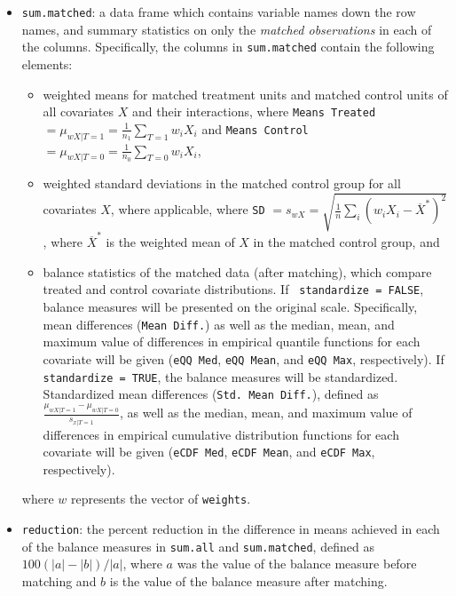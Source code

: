 \begin{itemize}
\item \texttt{sum.matched}: a data frame which contains variable names
  down the row names, and summary statistics on only the \emph{matched
    observations} in each of the columns.  Specifically, the columns
  in \texttt{sum.matched} contain the following elements:
  \begin{itemize}
  \item weighted means for matched treatment units and matched control units of all covariates
    $X$ and their interactions, where \texttt{Means Treated}$=
    \mu_{wX|T=1} = \frac{1}{n_1} \sum_{T=1} w_iX_i$ and \texttt{Means
      Control}$=\mu_{wX|T=0} = \frac{1}{n_0} \sum_{T=0} w_iX_i$,
  \item weighted standard deviations in the matched control group for
    all covariates $X$, where applicable, where \texttt{SD} $= s_{wX} =
    \sqrt{\frac{1}{n} \sum_{i} (w_iX_i - \overline{X}^*)^2}$, where
    $\overline{X}^*$ is the weighted mean of $X$ in the matched
    control group, and
  \item balance statistics of the matched data (after matching), which
    compare treated and control covariate distributions. If {\tt
      standardize = FALSE}, balance measures will be presented on the
    original scale. Specifically, mean differences (\texttt{Mean
      Diff.}) as well as the median, mean, and maximum value of
    differences in empirical quantile functions for each covariate
    will be given (\texttt{eQQ Med}, \texttt{eQQ Mean}, and
    \texttt{eQQ Max}, respectively). If {\tt standardize = TRUE}, the
    balance measures will be standardized.  Standardized mean
    differences (\texttt{Std.\ Mean Diff.}), defined as
    $\frac{\mu_{wX|T=1} - \mu_{wX|T=0}}{s_{x|T=1}}$, as well as the
    median, mean, and maximum value of differences in empirical
    cumulative distribution functions for each covariate will be given
    (\texttt{eCDF Med}, \texttt{eCDF Mean}, and \texttt{eCDF Max},
    respectively).
  \end{itemize}
  where $w$ represents the vector of \texttt{weights}.
  
\item \texttt{reduction}: the percent reduction in the difference in
  means achieved in each of the balance measures in \texttt{sum.all}
  and \texttt{sum.matched}, defined as $100(|a|-|b|)/|a|$, where $a$
  was the value of the balance measure before matching and $b$ is the
  value of the balance measure after matching.
  

\end{itemize}
